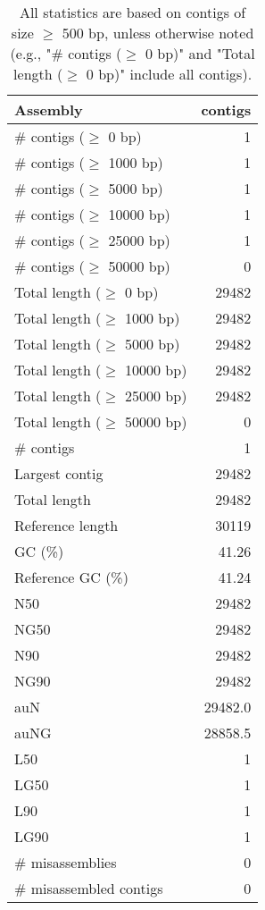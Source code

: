 \documentclass[12pt,a4paper]{article}
\begin{document}
\begin{table}[ht]
\begin{center}
\caption{All statistics are based on contigs of size $\geq$ 500 bp, unless otherwise noted (e.g., "\# contigs ($\geq$ 0 bp)" and "Total length ($\geq$ 0 bp)" include all contigs).}
\begin{tabular}{|l*{1}{|r}|}
\hline
Assembly & contigs \\ \hline
\# contigs ($\geq$ 0 bp) & 1 \\ \hline
\# contigs ($\geq$ 1000 bp) & 1 \\ \hline
\# contigs ($\geq$ 5000 bp) & 1 \\ \hline
\# contigs ($\geq$ 10000 bp) & 1 \\ \hline
\# contigs ($\geq$ 25000 bp) & 1 \\ \hline
\# contigs ($\geq$ 50000 bp) & 0 \\ \hline
Total length ($\geq$ 0 bp) & 29482 \\ \hline
Total length ($\geq$ 1000 bp) & 29482 \\ \hline
Total length ($\geq$ 5000 bp) & 29482 \\ \hline
Total length ($\geq$ 10000 bp) & 29482 \\ \hline
Total length ($\geq$ 25000 bp) & 29482 \\ \hline
Total length ($\geq$ 50000 bp) & 0 \\ \hline
\# contigs & 1 \\ \hline
Largest contig & 29482 \\ \hline
Total length & 29482 \\ \hline
Reference length & 30119 \\ \hline
GC (\%) & 41.26 \\ \hline
Reference GC (\%) & 41.24 \\ \hline
N50 & 29482 \\ \hline
NG50 & 29482 \\ \hline
N90 & 29482 \\ \hline
NG90 & 29482 \\ \hline
auN & 29482.0 \\ \hline
auNG & 28858.5 \\ \hline
L50 & 1 \\ \hline
LG50 & 1 \\ \hline
L90 & 1 \\ \hline
LG90 & 1 \\ \hline
\# misassemblies & 0 \\ \hline
\# misassembled contigs & 0 \\ \hline

\end{tabular}
\end{center}
\end{table}
\end{document}
